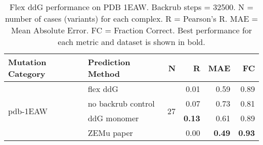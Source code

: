 \begin{table}
  \begin{tabular}{llrrrr}
\toprule
Mutation Category &   Prediction Method &   N &    R &  MAE &   FC \\
\midrule
 \multirow{ 4}{*}{pdb-1EAW} & flex ddG & \multirow{ 4}{*}{27} & 0.01 & 0.59 & 0.89  \\
 & no backrub control & & 0.07 & 0.73 & 0.81  \\
 & ddG monomer & & \textbf{0.13} & 0.61 & 0.89  \\
 & ZEMu paper & & 0.00 & \textbf{0.49} & \textbf{0.93}  \\
\bottomrule
\end{tabular}
  \caption[Flex ddG performance on PDB 1EAW]{
    Flex ddG performance on PDB 1EAW. Backrub steps = 32500. N = number of cases (variants) for each complex. R = Pearson's R. MAE = Mean Absolute Error. FC = Fraction Correct. Best performance for each metric and dataset is shown in bold.
  } \label{tab:table-pdb-1EAW}
\end{table}
